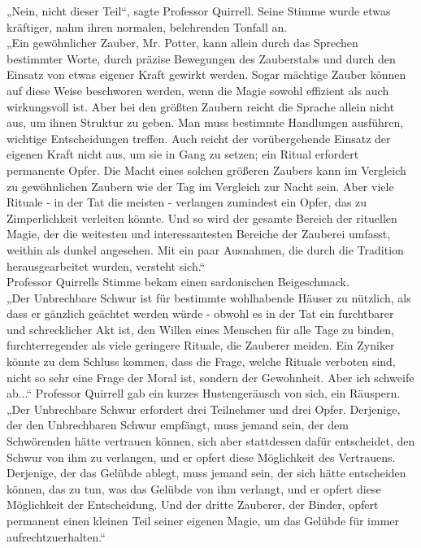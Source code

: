 {„Nein, nicht dieser Teil“, sagte Professor Quirrell. Seine Stimme wurde etwas kräftiger, nahm ihren normalen, belehrenden Tonfall an.\\ „Ein gewöhnlicher Zauber, Mr. Potter, kann allein durch das Sprechen bestimmter Worte, durch präzise Bewegungen des Zauberstabs und durch den Einsatz von etwas eigener Kraft gewirkt werden. Sogar mächtige Zauber können auf diese Weise beschworen werden, wenn die Magie sowohl effizient als auch wirkungsvoll ist. Aber bei den größten Zaubern reicht die Sprache allein nicht aus, um ihnen Struktur zu geben. Man muss bestimmte Handlungen ausführen, wichtige Entscheidungen treffen. Auch reicht der vorübergehende Einsatz der eigenen Kraft nicht aus, um sie in Gang zu setzen; ein Ritual erfordert permanente Opfer. Die Macht eines solchen größeren Zaubers kann im Vergleich zu gewöhnlichen Zaubern wie der Tag im Vergleich zur Nacht sein. Aber viele Rituale - in der Tat die meisten - verlangen zumindest ein Opfer, das zu Zimperlichkeit verleiten könnte. Und so wird der gesamte Bereich der rituellen Magie, der die weitesten und interessantesten Bereiche der Zauberei umfasst, weithin als dunkel angesehen. Mit ein paar Ausnahmen, die durch die Tradition herausgearbeitet wurden, versteht sich.“\\ Professor Quirrells Stimme bekam einen sardonischen Beigeschmack.\\ „Der Unbrechbare Schwur ist für bestimmte wohlhabende Häuser zu nützlich, als dass er gänzlich geächtet werden würde - obwohl es in der Tat ein furchtbarer und schrecklicher Akt ist, den Willen eines Menschen für alle Tage zu binden, furchterregender als viele geringere Rituale, die Zauberer meiden. Ein Zyniker könnte zu dem Schluss kommen, dass die Frage, welche Rituale verboten sind, nicht so sehr eine Frage der Moral ist, sondern der Gewohnheit. Aber ich schweife ab...“ Professor Quirrell gab ein kurzes Hustengeräusch von sich, ein Räuspern.\\ „Der Unbrechbare Schwur erfordert drei Teilnehmer und drei Opfer. Derjenige, der den Unbrechbaren Schwur empfängt, muss jemand sein, der dem Schwörenden hätte vertrauen können, sich aber stattdessen dafür entscheidet, den Schwur von ihm zu verlangen, und er opfert diese Möglichkeit des Vertrauens. Derjenige, der das Gelübde ablegt, muss jemand sein, der sich hätte entscheiden können, das zu tun, was das Gelübde von ihm verlangt, und er opfert diese Möglichkeit der Entscheidung. Und der dritte Zauberer, der Binder, opfert permanent einen kleinen Teil seiner eigenen Magie, um das Gelübde für immer aufrechtzuerhalten.“

}
